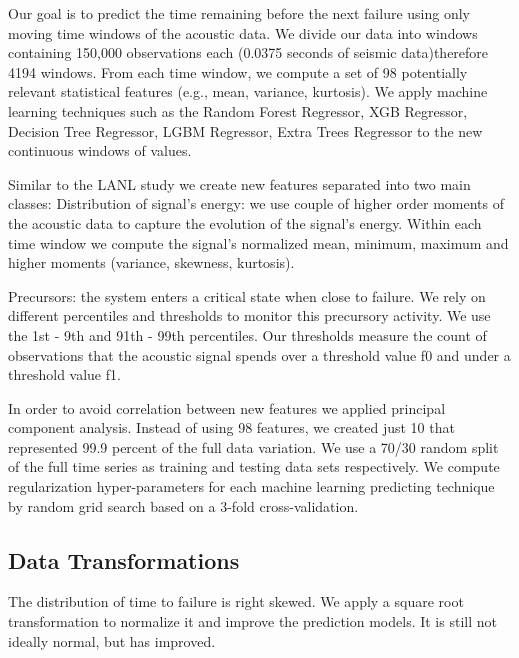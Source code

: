 \documentclass[]{llncs} %
\begin{document}


Our goal is to predict the time remaining before the next failure using only moving time windows of the acoustic data. We divide our data into windows containing 150,000 observations each (0.0375 seconds of seismic data)therefore 4194 windows. From each time window, we compute a set of 98 potentially relevant statistical features (e.g., mean, variance, kurtosis). 
We apply machine learning techniques such as the Random Forest Regressor, XGB Regressor,  Decision Tree Regressor, LGBM Regressor, Extra Trees Regressor to the new continuous windows of values.\par
Similar to the LANL study we create new features separated into two main classes: 
Distribution of signal’s energy: we use couple of higher order moments of the acoustic data to capture the evolution of the signal’s energy. Within each time window we compute the signal’s normalized mean, minimum, maximum and higher moments  (variance, skewness, kurtosis).\par
Precursors: the system enters a critical state when close to failure. We rely on different percentiles and thresholds to monitor this precursory activity. We use the 1st - 9th and 91th - 99th percentiles. Our thresholds measure the count of observations that the acoustic signal spends over a threshold value f0 and under a threshold value f1.

In order to avoid correlation between new features we applied principal component analysis.  Instead of using 98 features, we created just 10 that represented 99.9 percent of the full data variation.
We use a 70/30 random split of the full time series as training and testing data sets respectively. We compute regularization hyper-parameters for each machine learning predicting technique by random grid search based on a 3-fold cross-validation.
\subsection{Data Transformations}
The distribution of time to failure is right skewed. We apply a square root transformation to normalize it and improve the prediction models. It is still not ideally normal, but has improved.
\end{document}
